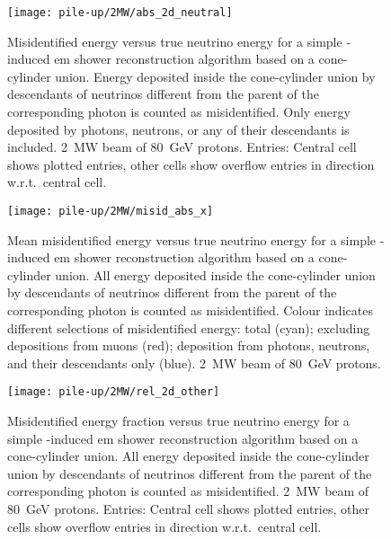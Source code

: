\begin{figure}[tbp]
	\centering
	\texttt{[image: pile-up/2MW/abs\_2d\_neutral]}
	\caption[Pile-up study misidentified vs.\ true neutrino energy, only neutrals, \SI{2}{\mega\watt} beam]{%
		Misidentified energy versus true neutrino energy for a simple \Pgpz-induced \acrshort{em} shower reconstruction algorithm based on a cone-cylinder union.
		Energy deposited inside the cone-cylinder union by descendants of neutrinos different from the parent of the corresponding \Pgpz photon is counted as misidentified.
		Only energy deposited by photons, neutrons, or any of their descendants is included.
		\SI{2}{\mega\watt} beam of \SI{80}{\giga\electronvolt} protons.
		Entries: Central cell shows plotted entries, other cells show overflow entries in direction w.r.t.\ central cell.
	}
\end{figure}

\begin{figure}[tbp]
	\centering
	\texttt{[image: pile-up/2MW/misid\_abs\_x]}
	\caption[Pile-up study mean misidentified vs.\ true neutrino energy, \SI{2}{\mega\watt} beam]{%
		Mean misidentified energy versus true neutrino energy for a simple \Pgpz-induced \acrshort{em} shower reconstruction algorithm based on a cone-cylinder union.
		All energy deposited inside the cone-cylinder union by descendants of neutrinos different from the parent of the corresponding \Pgpz photon is counted as misidentified.
		Colour indicates different selections of misidentified energy: total (cyan); excluding depositions from muons (red); deposition from photons, neutrons, and their descendants only (blue).
		\SI{2}{\mega\watt} beam of \SI{80}{\giga\electronvolt} protons.
	}
\end{figure}

\begin{figure}[tbp]
	\centering
	\texttt{[image: pile-up/2MW/rel\_2d\_other]}
	\caption[Pile-up study misidentified fractional vs.\ true neutrino energy, \SI{2}{\mega\watt} beam]{%
		Misidentified energy fraction versus true neutrino energy for a simple \Pgpz-induced \acrshort{em} shower reconstruction algorithm based on a cone-cylinder union.
		All energy deposited inside the cone-cylinder union by descendants of neutrinos different from the parent of the corresponding \Pgpz photon is counted as misidentified.
		\SI{2}{\mega\watt} beam of \SI{80}{\giga\electronvolt} protons.
		Entries: Central cell shows plotted entries, other cells show overflow entries in direction w.r.t.\ central cell.
	}
\end{figure}

